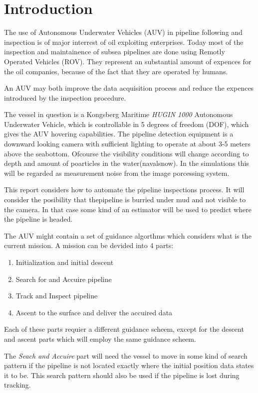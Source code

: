 \chapter{Introduction}

	The use of Autonomous Underwater Vehicles (AUV) in pipeline following and inspection is of major
	interrest of oil exploiting enterprises. Today most of the inspection and maintainence of subsea
	pipelines are done using Remotly Operated Vehicles (ROV). They represent an substantial amount of
	expences for the oil companies, because of the fact that they are operated by humans. 
	
	An AUV may both improve the data acquisition process and reduce the expences introduced by the
	inspection procedure. 
	
	The vessel in question is a Kongsberg Maritime \textit{HUGIN 1000} Autonomous Underwater Vehicle,
	which is controllable in 5 degrees of freedom (DOF), which gives the AUV hovering capabilities. The
	pipeline detection equipment is a downward looking camera with sufficient lighting to operate at about
	3-5 meters above the seabottom. Ofcourse the visibility conditions will change according to depth and
	amount of poarticles in the water(navalsnow). In the simulations this will be regarded as measurement
	noise from the image porcessing system. 
	
	
	This report considers how to automate the pipeline inspections process. It will consider the
	posibility that thepipeline is burried under mud and not visible to the camera. In that case some kind
	of an estimator	will be used to predict where the pipeline is headed.
	
	The AUV might contain a set of guidance algorthms which considers what is the current mission. A 
	mission can be devided into 4 parts:
	\begin{enumerate}
	 \item Initialization and initial descent
	 \item Search for and Accuire pipeline
	 \item Track and Inspect pipeline
	 \item Ascent to the surface and deliver the accuired data
	\end{enumerate}
	Each of these parts requier a different guidance scheem, except for the descent and ascent parts
	which will employ the same guidance scheem. 
	
	The \textit{Seach and Accuire} part will need the vessel to move in some kind of search pattern if
	the pipeline is not located exactly where the initial position data states it to be. This search
	pattern should also be used if the pipeline is lost during tracking. 
	

